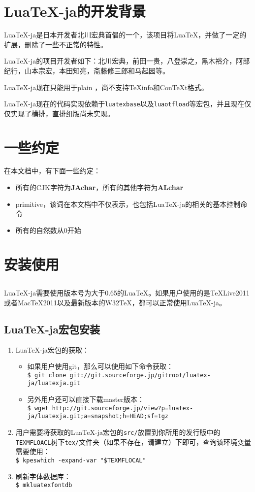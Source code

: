 \documentclass{ltjarticle}
\def\LuaTeX{Lua\TeX}
\def\pTeX{p\TeX}
\begin{document}
\section{\LuaTeX-ja的开发背景}
\LuaTeX-ja是日本开发者北川宏典首倡的一个，该项目将\LuaTeX，并做了一定的扩展，删除了一些不正常的特性。

\LuaTeX-ja的项目开发者如下：北川宏典，前田一贵，八登崇之，黑木裕介，阿部纪行，山本宗宏，本田知亮，斋藤修三郎和马起园等。

\LuaTeX-ja现在只能用于plain ，尚不支持\TeX info和Con\TeX t格式。

\LuaTeX-ja现在的代码实现依赖于\verb!luatexbase!以及\verb!luaotfload!等宏包，并且现在仅仅实现了横排，直排组版尚未实现。
\section{一些约定}
在本文档中，有下面一些约定：
\begin{itemize}
\item 所有的CJK字符为\textbf{JAchar}，所有的其他字符为\textbf{ALchar}
\item primitive，该词在本文档中不仅表示，也包括\LuaTeX-ja的相关的基本控制命令
\item 所有的自然数从0开始
\end{itemize}
\section{安装使用}
\subsection{}
\LuaTeX-ja需要使用版本号为大于0.65的\LuaTeX。如果用户使用的是\TeX Live2011或者Mac\TeX 2011以及最新版本的W32\TeX，都可以正常使用\LuaTeX-ja。
\subsection{\LuaTeX-ja宏包安装}
\begin{enumerate}
\item \LuaTeX-ja宏包的获取：
	\begin{itemize}
	\item 如果用户使用git，那么可以使用如下命令获取：\\
		\verb!$ git clone git://git.sourceforge.jp/gitroot/luatex-ja/luatexja.git!
	\item 另外用户还可以直接下载master版本：\\
		\verb!$ wget http://git.sourceforge.jp/view?p=luatex-ja/luatexja.git;a=snapshot;h=HEAD;sf=tgz!
	\end{itemize}
\item 用户需要将获取的\LuaTeX-ja宏包的\verb!src/!放置到你所用的发行版中的\verb!TEXMFLOACL!树下\verb!tex/!文件夹（如果不存在，请建立）下即可，查询该环境变量需要使用：\\
	\verb!$ kpeswhich -expand-var "$TEXMFLOCAL"!
\item 刷新字体数据库：\\
	\verb!$ mkluatexfontdb!
\end{enumerate}
\end{document}

